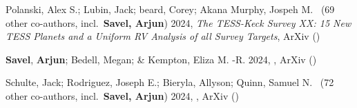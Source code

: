 \item[{\color{numcolor}\scriptsize3}] Polanski, Alex S.; Lubin, Jack; beard, Corey; Akana Murphy, Jospeh M. \etal\ ({69} other co-authors, incl.\ \textbf{Savel, Arjun}) 2024, \emph{The TESS-Keck Survey XX: 15 New TESS Planets and a Uniform RV Analysis of all Survey Targets}, ArXiv ()

\item[{\color{numcolor}\scriptsize2}] \textbf{Savel}, \textbf{Arjun}; Bedell, Megan; \& Kempton, Eliza M. -R. 2024, , ArXiv ()

\item[{\color{numcolor}\scriptsize1}] Schulte, Jack; Rodriguez, Joseph E.; Bieryla, Allyson; Quinn, Samuel N. \etal\ ({72} other co-authors, incl.\ \textbf{Savel, Arjun}) 2024, , ArXiv ()